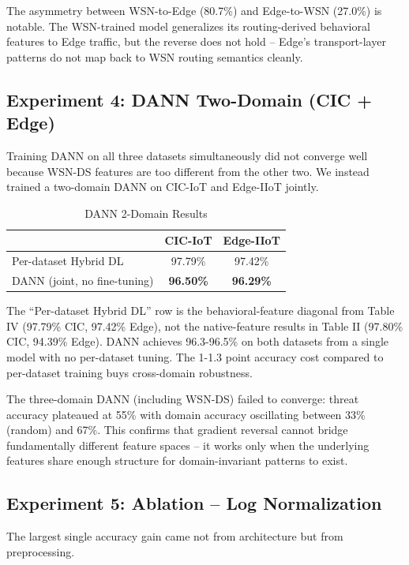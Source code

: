 \documentclass[conference]{IEEEtran}
\begin{document}
The asymmetry between WSN-to-Edge (80.7\%) and Edge-to-WSN (27.0\%) is notable. The WSN-trained model generalizes its routing-derived behavioral features to Edge traffic, but the reverse does not hold -- Edge's transport-layer patterns do not map back to WSN routing semantics cleanly.

\subsection{Experiment 4: DANN Two-Domain (CIC + Edge)}

Training DANN on all three datasets simultaneously did not converge well because WSN-DS features are too different from the other two. We instead trained a two-domain DANN on CIC-IoT and Edge-IIoT jointly.

\begin{table}[h]
\centering
\caption{DANN 2-Domain Results}
\label{tab:dann}
\begin{tabular}{lcc}
\toprule
 & \textbf{CIC-IoT} & \textbf{Edge-IIoT} \\
\midrule
Per-dataset Hybrid DL & 97.79\% & 97.42\% \\
DANN (joint, no fine-tuning) & \textbf{96.50\%} & \textbf{96.29\%} \\
\bottomrule
\end{tabular}
\end{table}

The ``Per-dataset Hybrid DL'' row is the behavioral-feature diagonal from Table IV (97.79\% CIC, 97.42\% Edge), not the native-feature results in Table II (97.80\% CIC, 94.39\% Edge). DANN achieves 96.3-96.5\% on both datasets from a single model with no per-dataset tuning. The 1-1.3 point accuracy cost compared to per-dataset training buys cross-domain robustness.

The three-domain DANN (including WSN-DS) failed to converge: threat accuracy plateaued at 55\% with domain accuracy oscillating between 33\% (random) and 67\%. This confirms that gradient reversal cannot bridge fundamentally different feature spaces -- it works only when the underlying features share enough structure for domain-invariant patterns to exist.

\subsection{Experiment 5: Ablation -- Log Normalization}

The largest single accuracy gain came not from architecture but from preprocessing.
\end{document}
